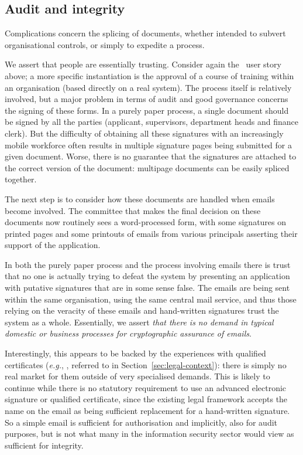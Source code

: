 \documentclass{article}
\def\cite{\citep}
\newcommand{\eg}{\textit{e.g.}}
\begin{document}
\subsection{Audit and integrity}

Complications concern the splicing of documents,
whether intended to subvert organisational controls, or simply to
expedite a process.  

We assert that people are essentially trusting.  Consider again the
\USTfinternal\ user story above; a more specific instantiation
is the approval of a course of training within an organisation (based
directly on a real system).  The process itself is relatively
involved, but a major problem in terms of audit and good governance
concerns the signing of these forms.  In a purely paper process, a
single document should be signed by all the parties (applicant,
supervisors, department heads and finance clerk).  But the difficulty
of obtaining all these signatures with an increasingly mobile
workforce often results in multiple signature pages being submitted
for a given document.  Worse, there is no guarantee that the
signatures are attached to the correct version of the document:
multipage documents can be easily spliced together.

The next step is to consider how these documents are handled when emails become
involved.  The committee that makes the final decision on these
documents now routinely sees a word-processed form, with some
signatures on printed pages and some printouts of emails from various
principals asserting their support of the application.  

In both the purely paper process and the process involving emails
there is trust that no one is actually trying to defeat the system by
presenting an application with putative signatures that are in some
sense false.  The emails are being sent within the same organisation,
using the same central mail service, and thus those relying on the
veracity of these emails and hand-written signatures trust the system
as a whole.  Essentially, we assert \emph{that there is no demand in
  typical domestic or business processes for cryptographic assurance of emails}.

Interestingly, this appears to be backed by the experiences with
qualified certificates (\eg, \cite{Krawczyk10}, referred to in
Section~\ref{sec:legal-context}): there is simply no real market for
them outside of very specialised demands.  This is likely to continue
while there is no statutory requirement to use an advanced electronic
signature or qualified certificate, since the existing legal framework
accepts the name on the email as being sufficient replacement for a
hand-written signature.  So a simple email is sufficient for
authorisation and implicitly, also for audit purposes, but is not what
many in the information security sector would view as sufficient for
integrity.
\end{document}
